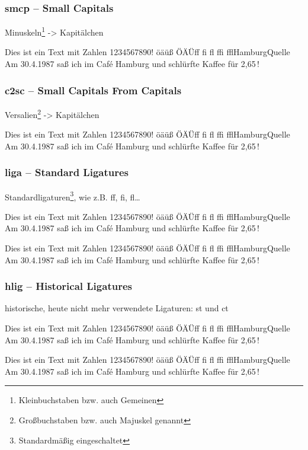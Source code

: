 \documentclass{fontdoku}
\def\TEXT{%
Dies ist ein Text mit Zahlen 1234567890!\newline%
öäüß ÖÄÜ\quad ff fi fl ffi ffl\quad Hamburg\quad Quelle\newline%
Am 30.4.1987 saß ich im \glqq{}Caf\'e Hamburg\grqq{} und schlürfte Kaffee für 2,65\,\libertineEuro!
}
\begin{document}
\subsubsection*{smcp -- Small Capitals}

Minuskeln\footnote{Kleinbuchstaben bzw. auch Gemeinen} -> Kapitälchen

\begin{lstsample}[hpos=l,lstsize=0.4,codesize=0.4,toprule,bottomrule]
\TEXT
\end{lstsample}




\subsubsection*{c2sc -- Small Capitals From Capitals}

Versalien\footnote{Großbuchstaben bzw. auch Majuskel genannt} -> Kapitälchen

\begin{lstsample}[hpos=l,lstsize=0.4,codesize=0.4,toprule,bottomrule]
\TEXT
\end{lstsample}


\subsubsection*{liga -- Standard Ligatures}

Standardligaturen\footnote{Standardmäßig eingeschaltet}, wie z.B. ff, fi, fl\dots

\begin{lstsample}[hpos=l,lstsize=0.4,codesize=0.4,toprule,bottomrule]
\TEXT

\TEXT
\end{lstsample}



\subsubsection*{hlig -- Historical Ligatures}

historische, heute nicht mehr verwendete Ligaturen: st und ct

\begin{lstsample}[hpos=l,lstsize=0.4,codesize=0.4,toprule,bottomrule]
\TEXT

\TEXT
\end{lstsample}
\end{document}
